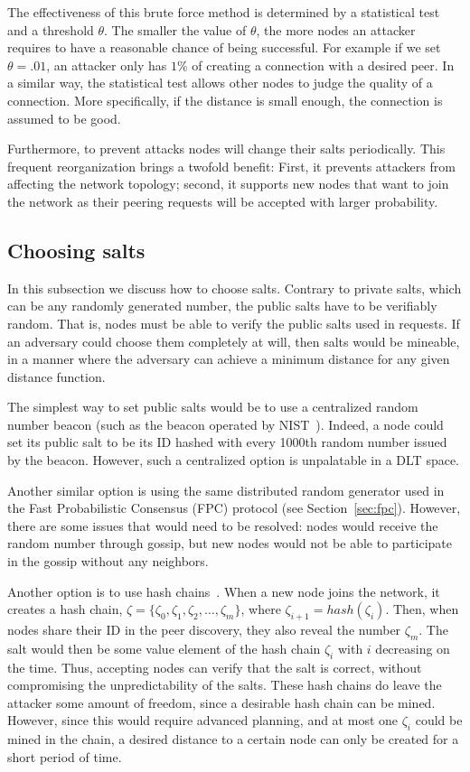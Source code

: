 \documentclass[../main.tex]{subfiles}
\begin{document}
The effectiveness of this brute force method is determined by a statistical test and a threshold $\theta$.  The smaller the value of $\theta$, the more nodes an attacker requires to have a reasonable chance of being successful. For example if we set $\theta=.01$, an attacker only has $1\%$ of creating a connection with a desired peer. In a similar way, the statistical test allows other nodes to judge the quality of a connection. More specifically, if the distance is small enough, the connection is assumed to be good.


Furthermore, to prevent attacks nodes will change their salts periodically.  This frequent reorganization brings a twofold benefit: First, it prevents attackers from affecting the network topology; second, it supports new nodes that want to join the network as their peering requests will be accepted with larger probability.


\subsection{Choosing salts}
\label{sec:salt}

In this subsection we discuss how to choose salts.  Contrary to private salts, which can be any randomly generated number, the public salts have to be verifiably random. That is, nodes must be able to verify the public salts used in requests.  If an adversary could choose them completely at will, then salts would be mineable, in a manner where the adversary can achieve a minimum distance for any given distance function.  

The simplest way to set public salts would be to use a centralized random number beacon (such as the beacon operated by NIST~\cite{nist:2019}). Indeed, a node could set its public salt to be its ID hashed with every 1000th random number issued by the beacon. However, such a centralized option is unpalatable in a DLT space.

Another similar option is using the same distributed random generator used in the Fast Probabilistic Consensus (FPC) protocol (see Section~\ref{sec:fpc}).  However, there are some issues that would need to be resolved: nodes would receive the random number through gossip, but new nodes would not be able to participate in the gossip without any neighbors.  

Another option is to use hash chains~\cite{lamport1981password}.  When a new node joins the network, it creates a hash chain, $\zeta=\{\zeta_0,\zeta_1,\zeta_2,\dots,\zeta_m\}$, where $\zeta_{i+1}=hash(\zeta_i)$. Then, when nodes share their ID in the peer discovery, they also reveal the number $\zeta_m$. The salt would then be some value element of the hash chain $\zeta_i$ with $i$ decreasing on the time. Thus, accepting nodes can verify that the salt is correct, without compromising the  unpredictability of the salts.  These hash chains do leave the attacker some amount of freedom, since a desirable hash chain can be mined.  However, since this would require advanced planning, and at most one $\zeta_i$ could be mined in the chain, a desired distance to a certain node can only be created for a short period of time.   
\end{document}
